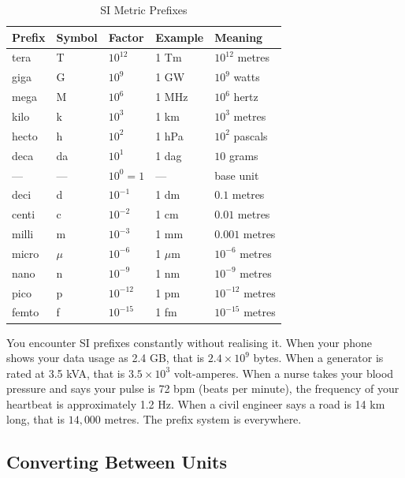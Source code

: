 \begin{table}[H]
\centering
\caption{SI Metric Prefixes}
\label{tab:prefixes}
\begin{tabular}{lllll}
\toprule
\textbf{Prefix} & \textbf{Symbol} & \textbf{Factor} &
\textbf{Example} & \textbf{Meaning}\\
\midrule
tera  & T & $10^{12}$ & 1 Tm & $10^{12}$ metres\\
giga  & G & $10^9$    & 1 GW & $10^9$ watts\\
mega  & M & $10^6$    & 1 MHz& $10^6$ hertz\\
kilo  & k & $10^3$    & 1 km & $10^3$ metres\\
hecto & h & $10^2$    & 1 hPa& $10^2$ pascals\\
deca  & da& $10^1$    & 1 dag& $10$ grams\\
---   & ---& $10^0 = 1$& ---  & base unit\\
deci  & d & $10^{-1}$ & 1 dm & $0.1$ metres\\
centi & c & $10^{-2}$ & 1 cm & $0.01$ metres\\
milli & m & $10^{-3}$ & 1 mm & $0.001$ metres\\
micro & $\mu$ & $10^{-6}$ & 1 $\mu$m & $10^{-6}$ metres\\
nano  & n & $10^{-9}$ & 1 nm & $10^{-9}$ metres\\
pico  & p & $10^{-12}$& 1 pm & $10^{-12}$ metres\\
femto & f & $10^{-15}$& 1 fm & $10^{-15}$ metres\\
\bottomrule
\end{tabular}
\end{table}

\begin{realworldbox}
You encounter SI prefixes constantly without realising it.
When your phone shows your data usage as 2.4 GB, that is
$2.4 \times 10^9$ bytes. When a generator is rated at
3.5 kVA, that is $3.5 \times 10^3$ volt-amperes. When a
nurse takes your blood pressure and says your pulse is
72 bpm (beats per minute), the frequency of your heartbeat
is approximately 1.2 Hz. When a civil engineer says a road
is 14 km long, that is $14{,}000$ metres. The prefix system
is everywhere.
\end{realworldbox}

\subsection{Converting Between Units}

